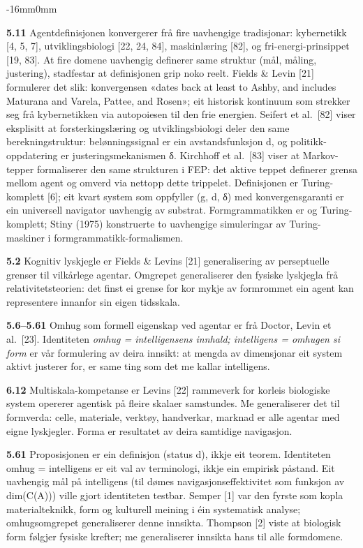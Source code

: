 \documentclass[10pt,oneside]{book}
\newcommand{\msym}[1]{{\mathfbfont #1}}
\newenvironment{widebody}{%
  \begin{adjustwidth}{-16mm}{0mm}%
}{%
  \end{adjustwidth}%
}
\begin{document}
\begin{widebody}
{\textbf{5.11} Agentdefinisjonen konvergerer frå fire uavhengige tradisjonar: kybernetikk [4, 5, 7], utviklingsbiologi [22, 24, 84], maskinlæring [82], og fri-energi-prinsippet [19, 83]. At fire domene uavhengig definerer same struktur (mål, måling, justering), stadfestar at definisjonen grip noko reelt. Fields \& Levin [21] formulerer det slik: konvergensen «dates back at least to Ashby, and includes Maturana and Varela, Pattee, and Rosen»; eit historisk kontinuum som strekker seg frå kybernetikken via autopoiesen til den frie energien. Seifert et al.\ [82] viser eksplisitt at forsterkingslæring og utviklingsbiologi deler den same berekningstruktur: belønningssignal er ein avstandsfunksjon d, og politikk-oppdatering er justeringsmekanismen δ. Kirchhoff et al.\ [83] viser at Markov-tepper formaliserer den same strukturen i FEP: det aktive teppet definerer grensa mellom agent og omverd via nettopp dette trippelet. Definisjonen er Turing-komplett [6]; eit kvart system som oppfyller (g, d, \msym{δ}) med konvergensgaranti er ein universell navigator uavhengig av substrat. Formgrammatikken er og Turing-komplett; Stiny (1975) konstruerte to uavhengige simuleringar av Turing-maskiner i formgrammatikk-formalismen.

\textbf{5.2} Kognitiv lyskjegle er Fields \& Levins [21] generalisering av perseptuelle grenser til vilkårlege agentar. Omgrepet generaliserer den fysiske lyskjegla frå relativitetsteorien: det finst ei grense for kor mykje av formrommet ein agent kan representere innanfor sin eigen tidsskala.

\textbf{5.6--5.61} Omhug som formell eigenskap ved agentar er frå Doctor, Levin et al.\ [23]. Identiteten \textit{omhug = intelligensens innhald; intelligens = omhugen si form} er vår formulering av deira innsikt: at mengda av dimensjonar eit system aktivt justerer for, er same ting som det me kallar intelligens.

\textbf{6.12} Multiskala-kompetanse er Levins [22] rammeverk for korleis biologiske system opererer agentisk på fleire skalaer samstundes. Me generaliserer det til formverda: celle, materiale, verktøy, handverkar, marknad er alle agentar med eigne lyskjegler. Forma er resultatet av deira samtidige navigasjon.

\textbf{5.61} Proposisjonen er ein definisjon (status d), ikkje eit teorem. Identiteten omhug = intelligens er eit val av terminologi, ikkje ein empirisk påstand. Eit uavhengig mål på intelligens (til dømes navigasjonseffektivitet som funksjon av dim(C(A))) ville gjort identiteten testbar. Semper [1] var den fyrste som kopla materialteknikk, form og kulturell meining i éin systematisk analyse; omhugsomgrepet generaliserer denne innsikta. Thompson [2] viste at biologisk form følgjer fysiske krefter; me generaliserer innsikta hans til alle formdomene.

}
\end{widebody}
\end{document}
